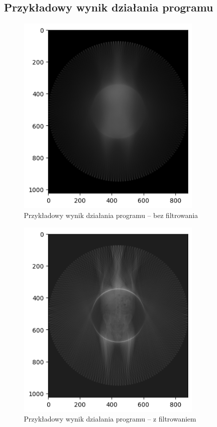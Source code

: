 \documentclass[11pt,a4paper]{article}
\begin{document}
    \subsection{Przykładowy wynik działania programu}
    \begin{figure}[H]
        \centering
        \includegraphics[width=0.8\textwidth]{inputoutput1}
        \caption{Przykładowy wynik działania programu -- bez filtrowania}
    \end{figure}

    \begin{figure}[H]
        \centering
        \includegraphics[width=0.8\textwidth]{inputoutput2}
        \caption{Przykładowy wynik działania programu -- z filtrowaniem}
    \end{figure}
\end{document}
